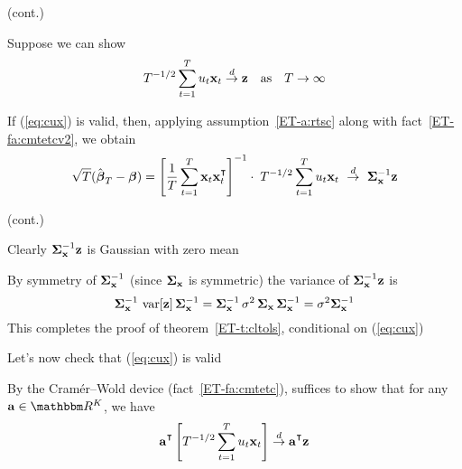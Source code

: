 \begin{frame}

    \vspace{2em}
    \Prf (cont.)
    
    Suppose we can show
    \begin{equation}
        \label{eq:cux}
        T^{-1/2} \sum_{t=1}^T u_t {\mathbf x}_t \stackrel { d } {\to} {\mathbf z}
        \quad \text{as} \quad T \to \infty
    \end{equation}
    
    If (\ref{eq:cux}) is valid, then, applying assumption~\ref{ET-a:rtsc} along with
    fact~\ref{ET-fa:cmtetcv2}, we obtain
    \begin{equation*}
        \sqrt{T}(\hboldbeta_T - \boldbeta)
        = \left[ \frac{1}{T} \sum_{t=1}^T \boldx_t \boldx_t^\T \right]^{-1} 
        \cdot \; T^{-1/2} \sum_{t=1}^T u_t \boldx_t
        \,\, \tod \,\, \Sigmaxinv \boldz
    \end{equation*}
    
\end{frame}

\begin{frame}

    \vspace{2em}
    \Prf (cont.)
    
    Clearly ${\boldsymbol \Sigma_{{\mathbf x}}^{-1}} {\mathbf z}$ is Gaussian with zero mean
    
    By symmetry of ${\boldsymbol \Sigma_{{\mathbf x}}^{-1}}$ (since ${\boldsymbol \Sigma_{{\mathbf x}}}$ is symmetric) the
    variance of ${\boldsymbol \Sigma_{{\mathbf x}}^{-1}} {\mathbf z}$ is
    \begin{equation*}
         {\boldsymbol \Sigma_{ {\mathbf x} }^{-1}} \, \operatorname{var}[{\mathbf z}] \, {\boldsymbol \Sigma_{{\mathbf x}}^{-1}} 
         = 
         {\boldsymbol \Sigma_{{\mathbf x}}^{-1}} \, \sigma^2 \, {\boldsymbol \Sigma_{{\mathbf x}}}  \,{\boldsymbol \Sigma_{{\mathbf x}}^{-1}} 
         = 
         \sigma^2 {\boldsymbol \Sigma_{{\mathbf x}}^{-1}} 
    \end{equation*}
    This completes the proof of theorem~\ref{ET-t:cltols}, conditional on 
    (\ref{eq:cux})
    
    Let's now check that (\ref{eq:cux}) is valid

    By the Cram\'er--Wold device (fact~\ref{ET-fa:cmtetc}),
    suffices to show that for any $\bolda \in \RR^K$, we have
    \begin{equation}
        \label{eq:cux2}
        \bolda^\T \left[ T^{-1/2} \sum_{t=1}^T u_t \boldx_t \right] \tod \bolda^\T \boldz
    \end{equation}
    
\end{frame}


